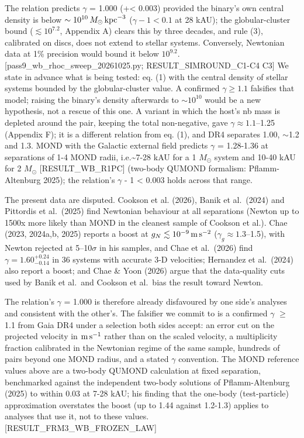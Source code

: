 \documentclass[
  10pt,
]{article}
\begin{document}
The relation predicts $\gamma$ = 1.000 (+\textless{} 0.003) provided the binary's own central density is below $\sim10^{10}\,M_\odot\,{\rm kpc}^{-3}$ ($\gamma-1<0.1$ at 28 kAU); the globular-cluster bound ($\lesssim10^{7.2}$, Appendix A) clears this by three decades, and rule (3), calibrated on discs, does not extend to stellar systems. Conversely, Newtonian data at 1\% precision would bound it below $10^{9.2}$. {[}pass9\_wb\_rhoc\_sweep\_20261025.py; RESULT\_SIMROUND\_C1-C4 C3{]} We state in advance what is being tested: eq. (1) with the central density of stellar systems bounded by the globular-cluster value. A confirmed $\gamma\ge1.1$ falsifies that model; raising the binary's density afterwards to $\sim10^{10}$ would be a new hypothesis, not a rescue of this one. A variant in which the host's nb mass is depleted around the pair, keeping the total non-negative, gave $\gamma\approx1.1$--1.25 (Appendix F); it is a different relation from eq. (1), and DR4 separates 1.00, $\sim$1.2 and 1.3. MOND with the Galactic external field predicts $\gamma$ = 1.28-1.36 at separations of 1-4 MOND radii, i.e.\textasciitilde{}7-28 kAU for a 1 $M_\odot$ system and 10-40 kAU for 2 $M_\odot$ {[}RESULT\_WB\_R1PC{]} (two-body QUMOND formalism: Pflamm-Altenburg 2025); the relation's $\gamma$ - 1 \textless{} 0.003 holds across that range.

The present data are disputed. Cookson et al. (2026), Banik et al.~(2024) and Pittordis et al.~(2025) find Newtonian behaviour at all separations (Newton up to 1500x more likely than MOND in the cleanest sample of Cookson et al.). Chae (2023, 2024a,b, 2025) reports a boost at $g_N\lesssim10^{-9}\,{\rm m\,s^{-2}}$ ($\gamma_g\approx1.3$--1.5), with Newton rejected at 5--10$\sigma$ in his samples, and Chae et al.~(2026) find $\gamma=1.60^{+0.24}_{-0.14}$ in 36 systems with accurate 3-D velocities; Hernandez et al.~(2024) also report a boost; and Chae \& Yoon (2026) argue that the data-quality cuts used by Banik et al.~and Cookson et al.~bias the result toward Newton.

The relation's $\gamma$ = 1.000 is therefore already disfavoured by one side's analyses and consistent with the other's. The falsifier we commit to is a confirmed $\gamma$ $\ge$ 1.1 from Gaia DR4 under a selection both sides accept: an error cut on the projected velocity in ${\rm m\,s^{-1}}$ rather than on the scaled velocity, a multiplicity fraction calibrated in the Newtonian regime of the same sample, hundreds of pairs beyond one MOND radius, and a stated $\gamma$ convention. The MOND reference values above are a two-body QUMOND calculation at fixed separation, benchmarked against the independent two-body solutions of Pflamm-Altenburg (2025) to within 0.03 at 7-28 kAU; his finding that the one-body (test-particle) approximation overstates the boost (up to 1.44 against 1.2-1.3) applies to analyses that use it, not to these values. {[}RESULT\_FRM3\_WB\_FROZEN\_LAW{]}
\end{document}
